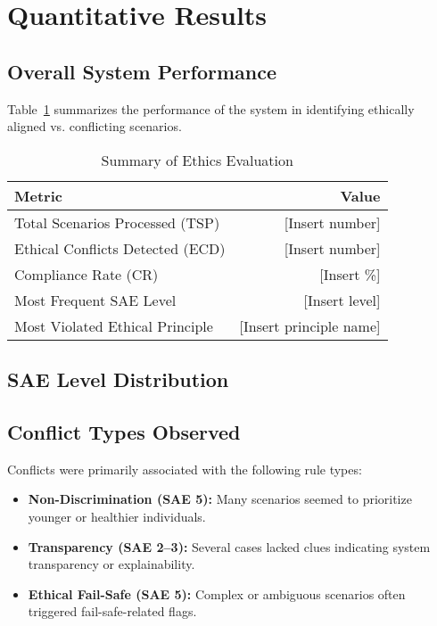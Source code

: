 \section{Quantitative Results}

\subsection{Overall System Performance}

Table~\ref{tab:ethics-summary} summarizes the performance of the system in identifying ethically aligned vs. conflicting scenarios.

\begin{table}
\centering
\caption{Summary of Ethics Evaluation}
\label{tab:ethics-summary}
\begin{tabular}{|l|r|}
\hline
\textbf{Metric} & \textbf{Value} \\
\hline
Total Scenarios Processed (TSP) & [Insert number] \\
Ethical Conflicts Detected (ECD) & [Insert number] \\
Compliance Rate (CR) & [Insert \%] \\
Most Frequent SAE Level & [Insert level] \\
Most Violated Ethical Principle & [Insert principle name] \\
\hline
\end{tabular}
\end{table}

\subsection{SAE Level Distribution}



\subsection{Conflict Types Observed}

Conflicts were primarily associated with the following rule types:

\begin{itemize}
    \item \textbf{Non-Discrimination (SAE 5):} Many scenarios seemed to prioritize younger or healthier individuals.
    \item \textbf{Transparency (SAE 2--3):} Several cases lacked clues indicating system transparency or explainability.
    \item \textbf{Ethical Fail-Safe (SAE 5):} Complex or ambiguous scenarios often triggered fail-safe-related flags.
\end{itemize}

